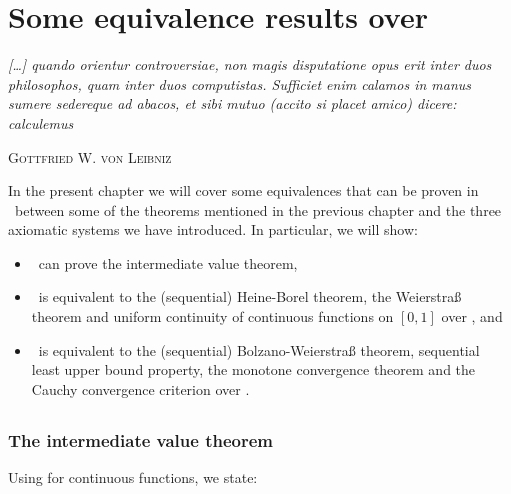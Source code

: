 \documentclass[../main.tex]{memoir}
\begin{document}
\chapter{Some equivalence results over \rca}

\epigraph{
  \textit{
    [\ldots] quando orientur controversiae, non magis disputatione opus erit inter duos
    philosophos, quam inter duos computistas. Sufficiet enim calamos in manus
    sumere sedereque ad abacos, et sibi mutuo (accito si placet amico)
    dicere: calculemus
  }
}{\textsc{Gottfried W. von Leibniz}}

In the present chapter we will cover some equivalences that can be proven in \rca\ between some of the theorems mentioned in the previous chapter and the three axiomatic systems we have introduced. In particular, we will show:

\begin{itemize}
\item \rca\ can prove the intermediate value theorem,
\item \wkl\ is equivalent to the (sequential) Heine-Borel theorem, the Weierstra{\ss} theorem and uniform continuity of continuous functions on $[0, 1]$ over \rca, and
\item \aca\ is equivalent to the (sequential) Bolzano-Weierstra{\ss} theorem, sequential least upper bound property, the monotone convergence theorem and the Cauchy convergence criterion over \rca.
\end{itemize}

\section{\rca}

\subsection{The intermediate value theorem}

Using  for continuous functions, we state:
\end{document}
